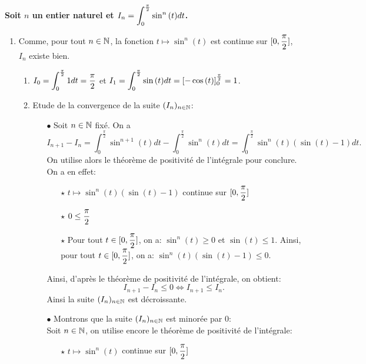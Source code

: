 \documentclass[a4paper, 11pt,reqno]{article}
\begin{document}
\begin{correction}\;
	\noindent \textbf{Soit $n$ un entier naturel et $\displaystyle I_n=\int_0^{\frac{\pi}{2}} \sin^n{(t)}dt$.}
	\begin{enumerate}
		\item Comme, pour tout $n\in\mathbb{N}$, la fonction $t\mapsto \sin^n{(t)}$ est continue sur $\lbrack 0,\displaystyle\frac{\pi}{2}\rbrack$, $I_n$ existe bien.
		      \begin{enumerate}
			      \item $\displaystyle I_0=\int_0^{\frac{\pi}{2}} 1dt=\displaystyle\frac{\pi}{2}$ et $\displaystyle I_1=\int_0^{\frac{\pi}{2}} \sin{(t)}dt= \left\lbrack -\cos{(t)}\right\rbrack_0^{\frac{\pi}{2}}=1$.
			      \item Etude de la convergence de la suite $(I_n)_{n\in\mathbb{N}}$:
			            \begin{itemize}
				            \item[$\bullet$] Soit $n\in\mathbb{N}$ fix\'e. On a
				                  $$I_{n+1}-I_n=\int_0^{\frac{\pi}{2}} \sin^{n+1}{(t)}dt-\int_0^{\frac{\pi}{2}} \sin^n{(t)}dt=\int_0^{\frac{\pi}{2}} \sin^n{(t)}(\sin{(t)} -1)dt.$$
				                  On utilise alors le th\'eor\`eme de positivit\'e de l'int\'egrale pour conclure. On a en effet:
				                  \begin{itemize}
					                  \item[$\star$] $t\mapsto \sin^n{(t)}(\sin{(t)} -1)$ continue sur $\lbrack 0,\displaystyle\frac{\pi}{2}\rbrack$
					                  \item[$\star$] $0 \leq \displaystyle\frac{\pi}{2}$
					                  \item[$\star$]  Pour tout $t\in \lbrack 0,\displaystyle\frac{\pi}{2}\rbrack$, on a: $\sin^n{(t)}\geq 0$ et $\sin{(t)}\leq 1$. Ainsi, pour tout $t\in \lbrack 0,\displaystyle\frac{\pi}{2}\rbrack$, on a: $ \sin^n{(t)}(\sin{(t)} -1) \leq 0$.
				                  \end{itemize}
				                  Ainsi, d'apr\`es le th\'eor\`eme de positivit\'e de l'int\'egrale, on obtient:
				                  $$I_{n+1}-I_n\leq 0\Leftrightarrow I_{n+1}\leq I_n.$$
				                  Ainsi la suite $(I_n)_{n\in\mathbb{N}}$ est d\'ecroissante.
				            \item[$\bullet$]  Montrons que la suite $(I_n)_{n\in\mathbb{N}}$ est minor\'ee par 0:\\
				                  \noindent Soit $n\in\mathbb{N}$, on utilise encore le th\'eor\`eme de positivit\'e de l'int\'egrale:
				                  \begin{itemize}
					                  \item[$\star$] $t\mapsto \sin^n{(t)}$ continue sur $\lbrack 0,\displaystyle\frac{\pi}{2}\rbrack$

\end{itemize}
\end{itemize}
\end{enumerate}
\end{enumerate}
\end{correction}
\end{document}
